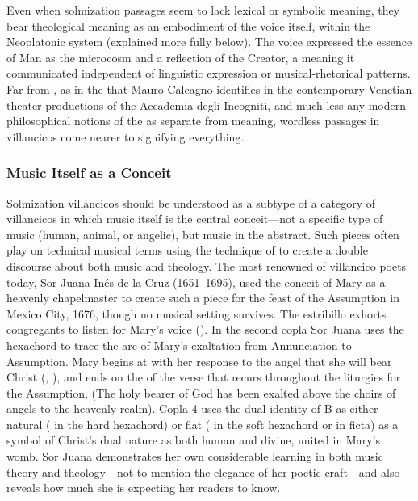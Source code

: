 Even when solmization passages seem to lack lexical or symbolic meaning, they
bear theological meaning as an embodiment of the voice itself, within the
Neoplatonic system (explained more fully below).
The voice expressed the essence of Man as the microcosm and a reflection of the
Creator, a meaning it communicated independent of linguistic expression or
musical-rhetorical patterns.
Far from , as in the  that Mauro Calcagno identifies in the contemporary Venetian theater
productions of the Accademia degli Incogniti, and much less any modern
philosophical notions of the  as separate from meaning,
wordless passages in villancicos come nearer to signifying everything.%
    \Autocites
    {Calcagno:SignifyingNothing}
    {Feldman:Voice}
    {Barthes:GrainOfVoice}
    {Dolar:Voice}
    {Cavarero:Voice}

\subsubsection{Music Itself as a Conceit}

Solmization villancicos should be understood as a subtype of a category of
villancicos in which music itself is the central conceit---not a specific type
of music (human, animal, or angelic), but music in the abstract.
Such pieces often play on technical musical terms using the technique of
 to create a double discourse about both music and theology.
The most renowned of villancico poets today, Sor Juana Inés de la Cruz
(1651--1695), used the conceit of Mary as a heavenly chapelmaster to create
such a piece for the feast of the Assumption in Mexico City, 1676, though no
musical setting survives.%
    \Autocite[, ]{SorJuana:VC} 
The estribillo exhorts congregants to listen for Mary's voice
().
In the second copla Sor Juana uses the hexachord to trace the arc of Mary's
exaltation from Annunciation to Assumption. 
Mary begins at  with her response to the angel that she will bear
Christ (, ), and ends on the
 of the verse that recurs throughout the liturgies for the Assumption,
 (The holy bearer of God has been exalted above the choirs of angels to
the heavenly realm).
Copla 4 uses the dual identity of B as either natural ( in the hard
hexachord) or flat ( in the soft hexachord or in ficta) as a symbol of
Christ's dual nature as both human and divine, united in Mary's womb.
Sor Juana demonstrates her own considerable learning in both music theory and
theology---not to mention the elegance of her poetic craft---and also reveals
how much she is expecting her readers to know.%
    \Autocites
    {Stevenson:SorJuanaMusicalRapports}
    {Tenorio:SorJuana}

